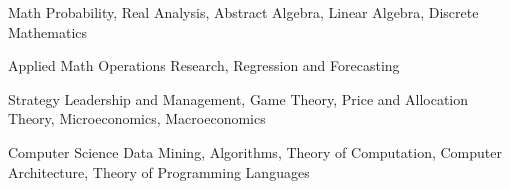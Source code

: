 

\begin{cvskills}

\cvskill
  {Math} %
  {Probability, Real Analysis, Abstract Algebra, Linear Algebra, Discrete Mathematics} %

  \cvskill
    {Applied Math} %
    {Operations Research, Regression and Forecasting} %

\cvskill
  {Strategy} %
  {Leadership and Management, Game Theory, Price and Allocation Theory, Microeconomics, Macroeconomics} %

  \cvskill
    {Computer Science} %
    {Data Mining, Algorithms, Theory of Computation, Computer Architecture, Theory of Programming Languages} %

\end{cvskills}
